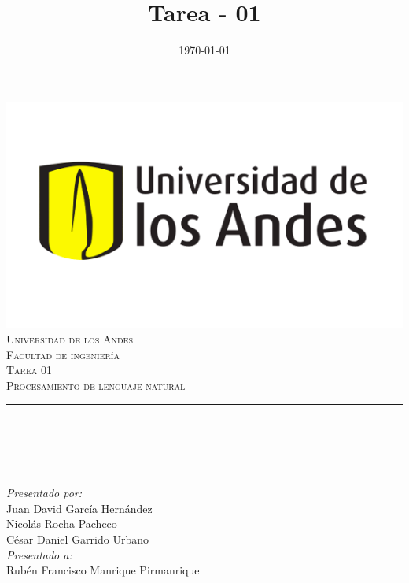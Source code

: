 \documentclass[12pt]{article}
\title{Tarea - 01}
\date{\today}
\makeatletter
\let\thetitle\@title
\makeatother
\begin{document}
    \pagestyle{fancy}
    \fancyhf{}

    \renewcommand{\headrulewidth}{0.7pt}
\fancyfoot[R]{\thepage}

\begin{titlepage}
	\centering
    \includegraphics[scale = 0.45]{images/Logo.png}\\[0.5 cm]	%
    \textsc{\large Universidad de los Andes\\
        \vspace{0.2cm} 
        Facultad de ingeniería\\
        \vspace{0.3cm} 
        Tarea 01}\\[2.0 cm]	%
	\textsc{\Large Procesamiento de lenguaje natural}\\[0.5 cm]
	\rule{\linewidth}{0.2 mm} \\[0.4 cm]
	{ \LARGE \bfseries \thetitle}\\
	\rule{\linewidth}{0.2 mm} \\[1.5 cm]
	
	\large
			\emph{Presentado por:} \\
			Juan David García Hernández\\
			Nicolás Rocha Pacheco\\
			César Daniel Garrido Urbano\\
	\vfill
	\large
			\emph{Presentado a:}\\
			Rubén Francisco Manrique Pirmanrique\\
\end{titlepage}
\end{document}
